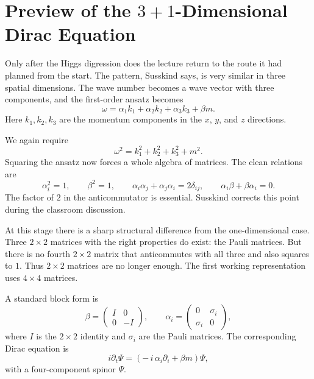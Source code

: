 \section{Preview of the \texorpdfstring{\(3+1\)}{3+1}-Dimensional Dirac Equation}

Only after the Higgs digression does the lecture return to the route it had planned from the start. The pattern, Susskind says, is very similar in three spatial dimensions. The wave number becomes a wave vector with three components, and the first-order ansatz becomes
\begin{equation}
\omega=\alpha_1k_1+\alpha_2k_2+\alpha_3k_3+\beta m.
\end{equation}
Here \(k_1,k_2,k_3\) are the momentum components in the \(x\), \(y\), and \(z\) directions.

We again require
\begin{equation}
\omega^2 = k_1^2+k_2^2+k_3^2+m^2.
\end{equation}
Squaring the ansatz now forces a whole algebra of matrices. The clean relations are
\begin{equation}
\alpha_i^2=1,
\qquad
\beta^2=1,
\qquad
\alpha_i\alpha_j+\alpha_j\alpha_i=2\delta_{ij},
\qquad
\alpha_i\beta+\beta\alpha_i=0.
\end{equation}
The factor of \(2\) in the anticommutator is essential. Susskind corrects this point during the classroom discussion.

At this stage there is a sharp structural difference from the one-dimensional case. Three \(2\times 2\) matrices with the right properties do exist: the Pauli matrices. But there is no fourth \(2\times 2\) matrix that anticommutes with all three and also squares to \(1\). Thus \(2\times 2\) matrices are no longer enough. The first working representation uses \(4\times 4\) matrices.

A standard block form is
\begin{equation}
\beta=
\begin{pmatrix}
I & 0\\
0 & -I
\end{pmatrix},
\qquad
\alpha_i=
\begin{pmatrix}
0 & \sigma_i\\
\sigma_i & 0
\end{pmatrix},
\end{equation}
where \(I\) is the \(2\times 2\) identity and \(\sigma_i\) are the Pauli matrices. The corresponding Dirac equation is
\begin{equation}
i\partial_t\Psi
=
\left(-\,i\,\alpha_i\partial_i+\beta m\right)\Psi,
\end{equation}
with a four-component spinor \(\Psi\).

